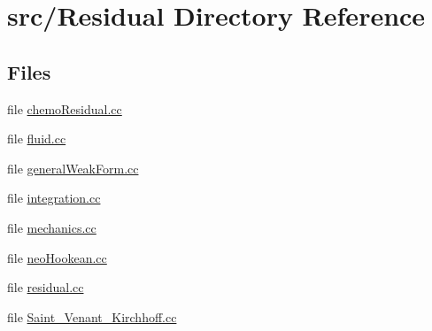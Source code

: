 \section{src/\+Residual Directory Reference}
\label{dir_cb721d3be779f9281060bf0ea0d84243}
\subsection*{Files}
\begin{DoxyCompactItemize}
\item 
file \mbox{\hyperlink{chemo_residual_8cc}{chemo\+Residual.\+cc}}
\item 
file \mbox{\hyperlink{fluid_8cc}{fluid.\+cc}}
\item 
file \mbox{\hyperlink{general_weak_form_8cc}{general\+Weak\+Form.\+cc}}
\item 
file \mbox{\hyperlink{integration_8cc}{integration.\+cc}}
\item 
file \mbox{\hyperlink{mechanics_8cc}{mechanics.\+cc}}
\item 
file \mbox{\hyperlink{neo_hookean_8cc}{neo\+Hookean.\+cc}}
\item 
file \mbox{\hyperlink{residual_8cc}{residual.\+cc}}
\item 
file \mbox{\hyperlink{_saint___venant___kirchhoff_8cc}{Saint\+\_\+\+Venant\+\_\+\+Kirchhoff.\+cc}}
\end{DoxyCompactItemize}
